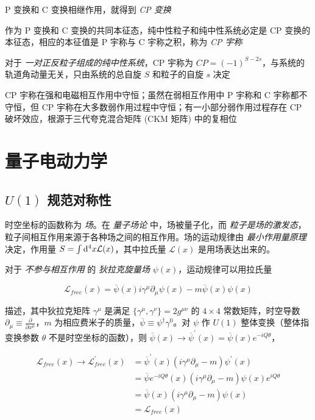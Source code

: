 P 变换和 C 变换相继作用，就得到 \emph{CP 变换}

作为 P 变换和 C 变换的共同本征态，纯中性粒子和纯中性系统必定是 CP 变换的本征态，相应的本征值是 P 宇称与 C 宇称之积，称为 \emph{CP 宇称}

对于 \emph{一对正反粒子组成的纯中性系统}，CP 宇称为 $CP = (-1)^{S-2s}$，与系统的轨道角动量无关，只由系统的总自旋 $S$ 和粒子的自旋 $s$ 决定

CP 宇称在强和电磁相互作用中守恒；虽然在弱相互作用中 P 宇称和 C 宇称都不守恒，但 CP 宇称在大多数弱作用过程中守恒；有一小部分弱作用过程存在 CP 破坏效应，根源于三代夸克混合矩阵 (CKM 矩阵) 中的复相位

\section{量子电动力学}

\subsection{\texorpdfstring{$U(1)$}{U(1)} 规范对称性}

时空坐标的函数称为 \emph{场}。在 \emph{量子场论} 中，场被量子化，而 \emph{粒子是场的激发态}，粒子间相互作用来源于各种场之间的相互作用。场的运动规律由 \emph{最小作用量原理} 决定，作用量 $S=\int \mathop{}\!\mathrm{d}^4 x \mathcal{L}(x)$，其中拉氏量 $\mathcal{L}(x)$ 是用场表达出来的。

对于 \emph{不参与相互作用} 的 \emph{狄拉克旋量场} $\psi(x)$，运动规律可以用拉氏量

\begin{equation}
    \mathcal{L}_{free}(x) = \overline{\psi}(x) i \gamma^\mu \partial_\mu \psi(x) - m \overline{\psi}(x) \psi(x)
\end{equation}

描述，其中狄拉克矩阵 $\gamma^\mu$ 是满足 $\{\gamma^\mu, \gamma^\nu\}=2 g^{\mu\nu}$ 的 $4 \times 4$ 常数矩阵，时空导数 $\partial_\mu \equiv \frac{\partial}{\partial x^\mu}$，$m$ 为相应费米子的质量，$\overline{\psi} \equiv \psi^\dagger \gamma^0$。对 $\psi$ 作 $U(1)$ 整体变换（整体指变换参数 $\theta$ 不是时空坐标的函数），则 $\overline{\psi}(x) \to \overline{\psi}^\prime (x) = \overline{\psi}(x) e^{-iQ\theta}$，

\begin{align}
    \mathcal{L}_{free} (x) \to \mathcal{L}_{free}^\prime (x) &= \overline{\psi}^\prime (x) (i \gamma^\mu \partial_\mu - m) \psi^\prime(x) \\
    &= \overline{\psi} e^{-iQ\theta} (x) (i \gamma^\mu \partial_\mu - m) \psi(x) e^{iQ\theta} \\
    &= \overline{\psi}(x) (i \gamma^\mu \partial_\mu - m) \psi(x) \\
    &= \mathcal{L}_{free} (x)
\end{align}

